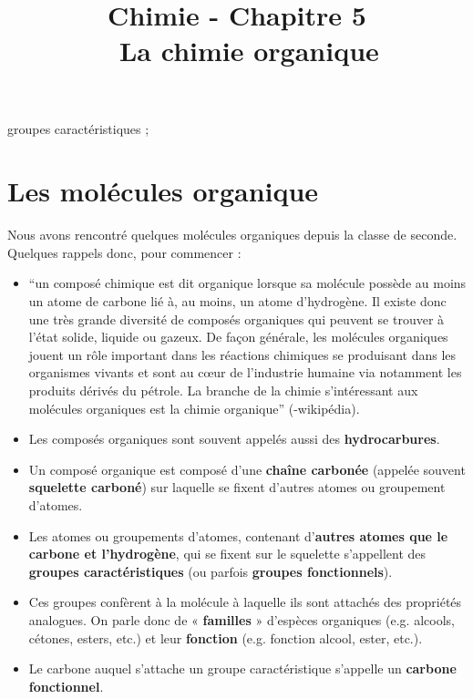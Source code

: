 \documentclass[11pt,a4paper]{article}
\title{\large Chimie - Chapitre 5 \\ \LARGE  La chimie organique}
\date{}
\author{}
\begin{document}
\vspace{-1cm}
\maketitle
\vspace{-1cm}
\begin{tcolorbox}[title=Notions de la classe de première à rappeler]
groupes caractéristiques ; 
\end{tcolorbox}
\tableofcontents

\section{Les molécules organique}
Nous avons rencontré quelques molécules organiques depuis la classe de seconde. Quelques rappels donc, pour commencer : 

\begin{defn}{}
\begin{itemize}
    \item ``un composé chimique est dit organique lorsque sa molécule possède au moins un atome de carbone lié à, au moins, un atome d'hydrogène. Il existe donc une très grande diversité de composés organiques qui peuvent se trouver à l'état solide, liquide ou gazeux. De façon générale, les molécules organiques jouent un rôle important dans les réactions chimiques se produisant dans les organismes vivants et sont au cœur de l'industrie humaine via notamment les produits dérivés du pétrole. La branche de la chimie s'intéressant aux molécules organiques est la chimie organique'' (-wikipédia).
    \item Les composés organiques sont souvent appelés aussi des \textbf{hydrocarbures}.
    \item Un composé organique est composé d’une \textbf{chaîne carbonée} (appelée souvent \textbf{squelette carboné}) sur laquelle se fixent d’autres atomes ou groupement d’atomes.
    \item Les atomes ou groupements d’atomes, contenant d'\textbf{autres atomes que le carbone et l'hydrogène}, qui se fixent sur le squelette s’appellent des \textbf{groupes caractéristiques} (ou parfois \textbf{groupes fonctionnels}).
    \item Ces groupes confèrent à la molécule à laquelle ils sont attachés des propriétés analogues. On parle donc de « \textbf{familles} » d’espèces organiques (e.g. alcools, cétones, esters, etc.) et leur \textbf{fonction} (e.g. fonction alcool, ester, etc.).
    \item Le carbone auquel s'attache un groupe caractéristique s'appelle un \textbf{carbone fonctionnel}. 
\end{itemize}
\end{defn}
\end{document}
